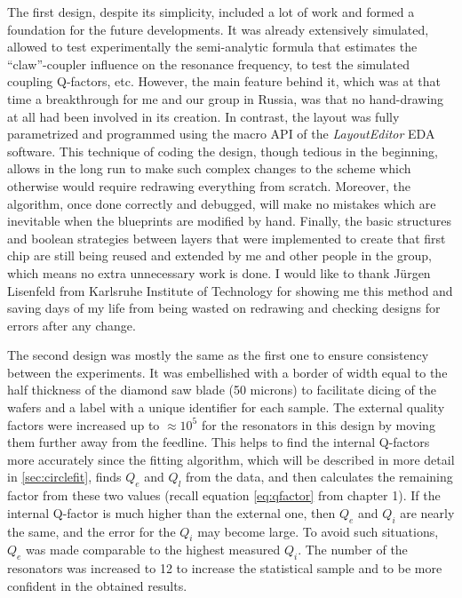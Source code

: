 The first design, despite its simplicity, included a lot of work and formed a foundation for the future developments. It was already extensively simulated, allowed to test experimentally the semi-analytic formula\cite{Sank2014} that estimates the ``claw''-coupler influence on the resonance frequency, to test the simulated coupling Q-factors, etc. However, the main feature behind it, which was at that time a breakthrough for me and our group in Russia, was that no hand-drawing at all had been involved in its creation. In contrast, the layout was fully parametrized and programmed using the macro API of the \textit{LayoutEditor} EDA software. This technique of coding the design, though tedious in the beginning, allows in the long run to make such complex changes to the scheme which otherwise would require redrawing everything from scratch. Moreover, the algorithm, once done correctly and debugged, will make no mistakes which are inevitable when the blueprints are modified by hand. Finally, the basic structures and boolean strategies between layers that were implemented to create that first chip are still being reused and extended by me and other people in the group, which means no extra unnecessary work is done. I would like to thank Jürgen Lisenfeld from Karlsruhe Institute of Technology for showing me this method and saving days of my life from being wasted on redrawing and checking designs for errors after any change.

The  second design was mostly the same as the first one to ensure consistency between the experiments. It was embellished with a border of width equal to the half thickness of the diamond saw blade (50 microns) to facilitate dicing of the wafers and a label with a unique identifier for each sample. The external quality factors were increased up to $\approx 10^{5}$ for the resonators in this design by moving them further away from the feedline. This helps to find the internal Q-factors more accurately since the fitting algorithm, which will be described in more detail in \autoref{sec:circlefit}, finds $Q_e$ and $Q_l$ from the data, and then calculates the remaining factor from these two values (recall equation \eqref{eq:qfactor} from chapter 1). If the internal Q-factor is much higher than the external one, then $Q_e$ and $Q_i$ are nearly the same, and the error for the $Q_i$ may become large. To avoid such situations, $Q_e$ was made comparable to the highest measured $Q_i$. The number of the resonators was increased to 12 to increase the statistical sample and to be more confident in the obtained results.

